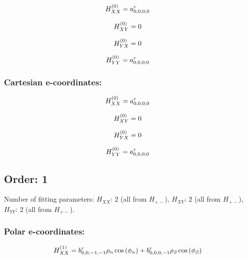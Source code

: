 \documentclass[fleqn]{article}
\begin{document}
\begin{dmath*}
H_{XX}^{(0)}=a^{r}_{0,0,0,0}\\
\end{dmath*}

\begin{dmath*}
H_{XY}^{(0)}=0\\
\end{dmath*}

\begin{dmath*}
H_{YX}^{(0)}=0\\
\end{dmath*}

\begin{dmath*}
H_{YY}^{(0)}= a^{r}_{0,0,0,0}\\
\end{dmath*}
\subsubsection*{Cartesian e-coordinates:}

\begin{dmath*}
H_{XX}^{(0)}=a^{r}_{0,0,0,0}\\
\end{dmath*}

\begin{dmath*}
H_{XY}^{(0)}=0\\
\end{dmath*}

\begin{dmath*}
H_{YX}^{(0)}=0\\
\end{dmath*}

\begin{dmath*}
H_{YY}^{(0)}= a^{r}_{0,0,0,0}\\
\end{dmath*}
\subsection{Order: 1}
Number of fitting parameters: $H_{XX}$: $2$ (all from $H_{+-}$), $H_{XY}$: $2$ (all from $H_{+-}$), $H_{YY}$: $2$ (all from $H_{+-}$).
\subsubsection*{Polar e-coordinates:}

\begin{dmath*}
H_{XX}^{(1)}=b^{r}_{0,0,-1,-1} \rho_{\alpha} \cos{\left (\phi_{\alpha} \right )} + b^{r}_{0,0,0,-1} \rho_{\beta} \cos{\left (\phi_{\beta} \right )}\\
\end{dmath*}
\end{document}
